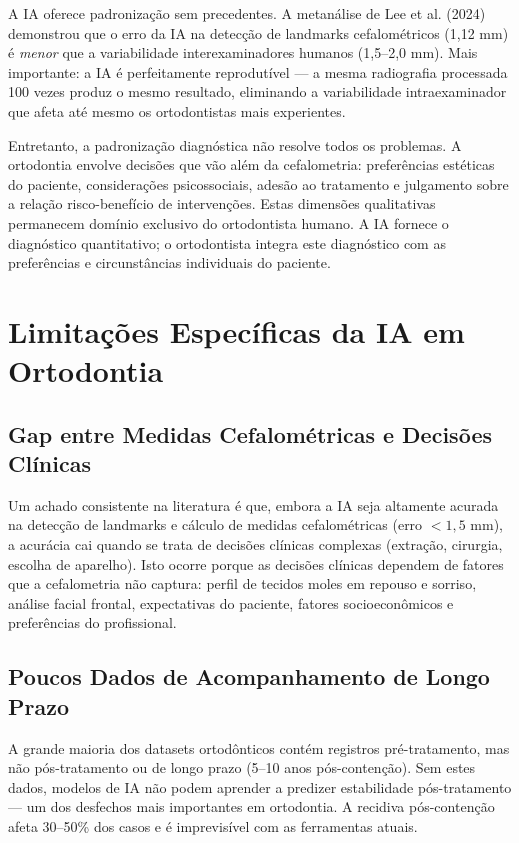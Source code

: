 A IA oferece padronização sem precedentes. A metanálise de Lee et al. (2024) demonstrou que o erro da IA na detecção de landmarks cefalométricos (1,12 mm) é \textit{menor} que a variabilidade interexaminadores humanos (1,5--2,0 mm). Mais importante: a IA é perfeitamente reprodutível --- a mesma radiografia processada 100 vezes produz o mesmo resultado, eliminando a variabilidade intraexaminador que afeta até mesmo os ortodontistas mais experientes.

Entretanto, a padronização diagnóstica não resolve todos os problemas. A ortodontia envolve decisões que vão além da cefalometria: preferências estéticas do paciente, considerações psicossociais, adesão ao tratamento e julgamento sobre a relação risco-benefício de intervenções. Estas dimensões qualitativas permanecem domínio exclusivo do ortodontista humano. A IA fornece o diagnóstico quantitativo; o ortodontista integra este diagnóstico com as preferências e circunstâncias individuais do paciente.

\section{Limitações Específicas da IA em Ortodontia}

\subsection{Gap entre Medidas Cefalométricas e Decisões Clínicas}

Um achado consistente na literatura é que, embora a IA seja altamente acurada na detecção de landmarks e cálculo de medidas cefalométricas (erro $<1,5$ mm), a acurácia cai quando se trata de decisões clínicas complexas (extração, cirurgia, escolha de aparelho). Isto ocorre porque as decisões clínicas dependem de fatores que a cefalometria não captura: perfil de tecidos moles em repouso e sorriso, análise facial frontal, expectativas do paciente, fatores socioeconômicos e preferências do profissional.

\subsection{Poucos Dados de Acompanhamento de Longo Prazo}

A grande maioria dos datasets ortodônticos contém registros pré-tratamento, mas não pós-tratamento ou de longo prazo (5--10 anos pós-contenção). Sem estes dados, modelos de IA não podem aprender a predizer estabilidade pós-tratamento --- um dos desfechos mais importantes em ortodontia. A recidiva pós-contenção afeta 30--50\% dos casos e é imprevisível com as ferramentas atuais.


